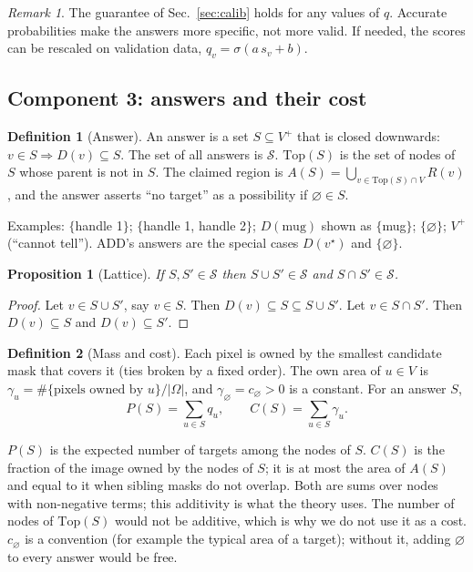 \documentclass[11pt,a4paper]{article}
\newtheorem{proposition}{Proposition}
\theoremstyle{definition}
\newtheorem{definition}{Definition}
\theoremstyle{remark}
\newtheorem{remark}{Remark}
\newcommand{\nul}{\varnothing}
\newcommand{\cS}{\mathcal{S}}
\newcommand{\Top}{\mathrm{Top}}
\begin{document}
\begin{remark}
The guarantee of Sec.~\ref{sec:calib} holds for any values of $q$. Accurate probabilities make the answers more
specific, not more valid. If needed, the scores can be rescaled on validation data, $q_v=\sigma(a\,s_v+b)$.
\end{remark}

\subsection{Component 3: answers and their cost}
\begin{definition}[Answer]\label{def:answer}
An answer is a set $S\subseteq V^+$ that is closed downwards: $v\in S\Rightarrow D(v)\subseteq S$. The set of all
answers is $\cS$. $\Top(S)$ is the set of nodes of $S$ whose parent is not in $S$. The claimed region is
$A(S)=\bigcup_{v\in\Top(S)\cap V}R(v)$, and the answer asserts ``no target'' as a possibility if $\nul\in S$.
\end{definition}
Examples: $\{$handle 1$\}$; $\{$handle 1, handle 2$\}$; $D(\text{mug})$ shown as $\{$mug$\}$; $\{\nul\}$; $V^+$
(``cannot tell''). ADD's answers are the special cases $D(v^\star)$ and $\{\nul\}$.

\begin{proposition}[Lattice]\label{prop:lattice}
If $S,S'\in\cS$ then $S\cup S'\in\cS$ and $S\cap S'\in\cS$.
\end{proposition}
\begin{proof}
Let $v\in S\cup S'$, say $v\in S$. Then $D(v)\subseteq S\subseteq S\cup S'$. Let $v\in S\cap S'$. Then
$D(v)\subseteq S$ and $D(v)\subseteq S'$.
\end{proof}

\begin{definition}[Mass and cost]\label{def:cost}
Each pixel is owned by the smallest candidate mask that covers it (ties broken by a fixed order). The own area of
$u\in V$ is $\gamma_u=\#\{\text{pixels owned by }u\}/|\Omega|$, and $\gamma_\nul=c_\nul>0$ is a constant. For an
answer $S$,
\[
P(S)=\sum_{u\in S}q_u,\qquad C(S)=\sum_{u\in S}\gamma_u .
\]
\end{definition}
$P(S)$ is the expected number of targets among the nodes of $S$. $C(S)$ is the fraction of the image owned by the
nodes of $S$; it is at most the area of $A(S)$ and equal to it when sibling masks do not overlap. Both are sums
over nodes with non-negative terms; this additivity is what the theory uses. The number of nodes of $\Top(S)$ would
not be additive, which is why we do not use it as a cost. $c_\nul$ is a convention (for example the typical area of
a target); without it, adding $\nul$ to every answer would be free.
\end{document}
